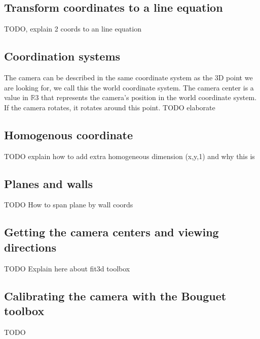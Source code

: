 \subsection{Transform coordinates to a line equation}
\label{sec:lineeq}
TODO, explain 2 coords to an line equation


\subsection{Coordination systems}
The camera can be described in the same coordinate system as the 3D point we are
looking for, we call this the world coordinate system. 
The camera center is a value in $\mathbb{R}$3 that represents the camera's position in the world
coordinate system. If the camera rotates, it rotates around this point.
TODO elaborate\\

\subsection{Homogenous coordinate}
TODO explain how to add extra homogeneous dimension (x,y,1) and why this is


\subsection{Planes and walls}
\label{sec:planeswalls}
TODO How to span plane by wall coords

\subsection{Getting the camera centers and viewing directions}
\label{sec:cameracenters}
TODO Explain here about fit3d toolbox

\subsection{Calibrating the camera with the Bouguet toolbox}
\label{sec:bouguet}
TODO


